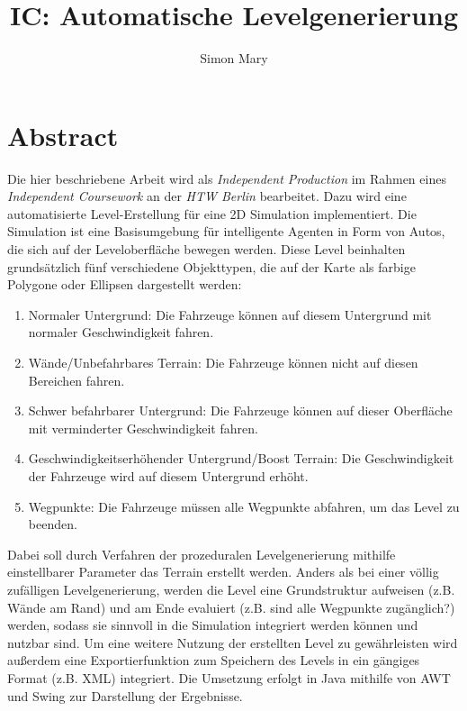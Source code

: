 \documentclass[10pt,a4paper]{article}
\begin{document}


	
	
\title{IC: Automatische Levelgenerierung}
\author{Simon Mary}
\maketitle

\section*{Abstract}
Die hier beschriebene Arbeit wird als \textit{Independent Production} im Rahmen eines \textit{Independent Coursework} an der \textit{HTW Berlin} bearbeitet. Dazu wird eine automatisierte Level-Erstellung für eine 2D Simulation implementiert. Die Simulation ist eine Basisumgebung für intelligente Agenten in Form von Autos, die sich auf der Leveloberfläche bewegen werden. Diese Level beinhalten grundsätzlich fünf verschiedene Objekttypen, die auf der Karte als farbige Polygone oder Ellipsen dargestellt werden: 

\begin{enumerate}
\item{}Normaler Untergrund: Die Fahrzeuge können auf diesem Untergrund mit normaler Geschwindigkeit fahren.
\item{}Wände/Unbefahrbares Terrain: Die Fahrzeuge können nicht auf diesen Bereichen fahren.
\item{}Schwer befahrbarer Untergrund: Die Fahrzeuge können auf dieser Oberfläche mit verminderter Geschwindigkeit fahren.
\item{}Geschwindigkeitserhöhender Untergrund/Boost Terrain: Die Geschwindigkeit der Fahrzeuge wird auf diesem Untergrund erhöht.
\item{}Wegpunkte: Die Fahrzeuge müssen alle Wegpunkte abfahren, um das Level zu beenden.
\end{enumerate}

Dabei soll durch Verfahren der prozeduralen Levelgenerierung mithilfe einstellbarer Parameter das Terrain erstellt werden. Anders als bei einer völlig zufälligen Levelgenerierung, werden die Level eine Grundstruktur aufweisen (z.B. Wände am Rand) und am Ende evaluiert (z.B. sind alle Wegpunkte zugänglich?) werden, sodass sie sinnvoll in die Simulation integriert werden können und nutzbar sind. Um eine weitere Nutzung der erstellten Level zu gewährleisten wird außerdem eine Exportierfunktion zum Speichern des Levels in ein gängiges Format (z.B. XML) integriert.
Die Umsetzung erfolgt in Java mithilfe von AWT und Swing zur Darstellung der Ergebnisse.


\end{document}
